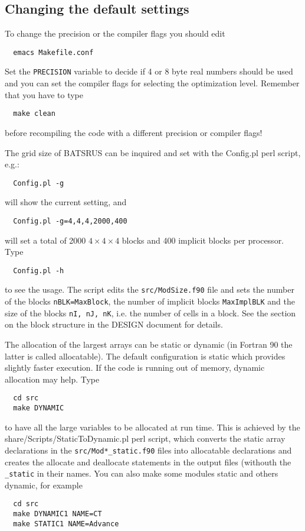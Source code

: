 \subsection{Changing the default settings}

To change the precision or the compiler flags you should edit 
\begin{verbatim}
  emacs Makefile.conf
\end{verbatim}
Set the {\tt PRECISION} variable to decide
if 4 or 8 byte real numbers should be used and you can set the compiler flags
for selecting the optimization level. Remember that you have to type
\begin{verbatim}
  make clean
\end{verbatim}
before recompiling the code with a different precision or compiler flags!

The grid size of BATSRUS can be inquired and set with the Config.pl perl 
script, e.g.:
\begin{verbatim}
  Config.pl -g
\end{verbatim}
will show the current setting, and 
\begin{verbatim}
  Config.pl -g=4,4,4,2000,400
\end{verbatim}
will set a total of 2000 $4\times4\times4$ blocks and 400 implicit blocks
per processor. Type
\begin{verbatim}
  Config.pl -h
\end{verbatim}
to see the usage. The script edits the {\tt src/ModSize.f90} file
and sets the number of the blocks {\tt nBLK=MaxBlock},
the number of implicit blocks {\tt MaxImplBLK}             %
and the size of the blocks {\tt nI, nJ, nK}, i.e. the number of cells
in a block.
See the section on the block structure in the DESIGN document for details.

The allocation of the largest arrays can be static or dynamic
(in Fortran 90 the latter is called allocatable). The default
configuration is static which provides slightly faster execution.
If the code is running out of memory, dynamic allocation may help.
Type
\begin{verbatim}
  cd src
  make DYNAMIC
\end{verbatim}
to have all the large variables to be allocated at run time.
This is achieved by the share/Scripts/StaticToDynamic.pl perl
script, which converts the static array declarations in the
{\tt src/Mod*\_static.f90} files into
allocatable declarations and creates the allocate and deallocate
statements in the output files (withouth the {\tt \_static} in their
names. You can also make some modules static and others dynamic, for example
\begin{verbatim}
  cd src
  make DYNAMIC1 NAME=CT
  make STATIC1 NAME=Advance
\end{verbatim}

